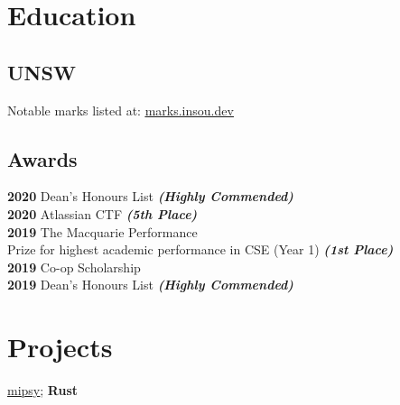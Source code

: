 \documentclass[a4paper]{deedy-resume}
\begin{document}
\begin{minipage}[t]{0.35\textwidth}


\section{Education} 

\subsection{UNSW}

Notable marks listed at:
\href{https://marks.insou.dev}{\underline{marks.insou.dev}}

\sectionspace

\subsection{Awards}

\textbf{2020}
Dean's Honours List
{\footnotesize \textit{\textbf{(Highly Commended) }}} \\

\textbf{2020}
Atlassian CTF
{\footnotesize \textit{\textbf{(5th Place) }}} \\

\textbf{2019}
The Macquarie Performance \\
Prize for highest academic performance
in CSE (Year 1)
{\footnotesize \textit{\textbf{(1st Place) }}} \\

\textbf{2019}
Co-op Scholarship \\

\textbf{2019}
Dean's Honours List
{\footnotesize \textit{\textbf{(Highly Commended) }}} \\

\sectionspace


\section{Projects}

\href{https://github.com/insou22/mipsy}
	{\underline{mipsy}}; \textbf{ Rust}


\end{minipage}
\end{document}
